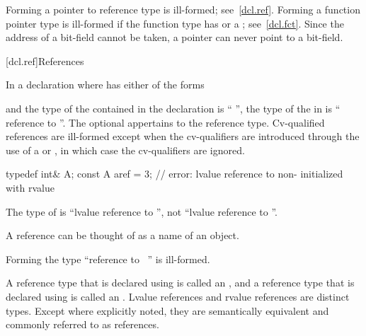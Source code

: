 \pnum
\begin{note}
Forming a pointer to reference type is ill-formed; see~\ref{dcl.ref}.
Forming a function pointer type is ill-formed if the function type has
 or a ;
see~\ref{dcl.fct}.
Since the address of a bit-field cannot be taken,
a pointer can never point to a bit-field.
\end{note}

[dcl.ref]{References}%

\pnum
In a declaration
where
has either of the forms
\begin{ncsimplebnf}
\terminal{\&}  \br
\terminal{\&\&}  
\end{ncsimplebnf}
and the type of the contained  in the declaration
is ``
'',
the type of the  in
is `` reference to
''.
The optional  appertains to the reference type.
Cv-qualified references are ill-formed except when the cv-qualifiers
are introduced through the use of a
 or
,
in which case the cv-qualifiers are ignored.
\begin{example}
\begin{codeblock}
typedef int& A;
const A aref = 3;   // error: lvalue reference to non- initialized with rvalue
\end{codeblock}

The type of
is ``lvalue reference to '',
not ``lvalue reference to ''.
\end{example}
\begin{note}
A reference can be thought of as a name of an object.
\end{note}
%
Forming the type
``reference to \cv{}~''
is ill-formed.


\pnum
A reference type that is declared using \tcode{\&} is called an
, and a reference type that
is declared using \tcode{\&\&} is called an
. Lvalue references and
rvalue references are distinct types. Except where explicitly noted, they are
semantically equivalent and commonly referred to as references.

